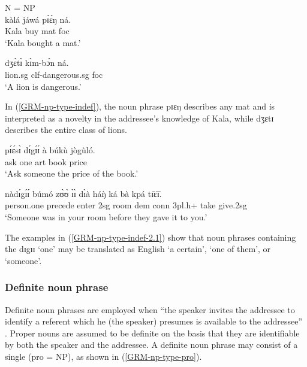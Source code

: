 \begin{exe}
\begin{exe}
\begin{exe}
\ea\label{GRM-np-type-indef}{\rm  N = NP}\\

 
\ea\label{GRM-np-indef-1}
\gll  kàlá jáwá   pɪ́ɛ́ŋ ná.\\
  Kala buy mat {\sc foc}\\
\glt  `Kala bought a mat.' 


\ex\label{GRM-np-indef-2}
\gll  dʒɛ̀tɪ̀ kɪ̀m-bɔ́n  ná.\\
  {lion.{\sc sg}} {\sc clf}-dangerous.{\sc sg} {\sc foc}\\
\glt  `A lion is dangerous.' 



\z 
 \z

In (\ref{GRM-np-type-indef}),  the noun phrase {\sls  pɪɛŋ}  describes any mat
and
is interpreted as a novelty in the addressee's knowledge of Kala, while
{\sls dʒɛtɪ} describes the entire class of lions. 


\ea\label{GRM-np-type-indef-2.1}

 \ea\label{GRM-np-type-indef-2.2}
\gll pɪ́ɛ́sɪ̀ dɪ́gɪ́ɪ́ à búkù jògùló.\\
 ask one {\sc art} book price\\
\glt  `Ask someone the price of the book.' 

 \ex\label{GRM-np-type-indef-2.3}
\gll nàdɪ́gɪ́ɪ́ búmó zʊ̀ʊ̀ ɪ̀ɪ̀ dɪ̀à háŋ̀ ká bà kpá tɪ̄ɛ̄ɪ̄.\\
 person.one precede enter {\sc 2sg} room {\sc dem} {\sc conn} {\sc 3pl.h+} take give.{\sc 2sg} \\
 \glt  `Someone was in your room before they gave it to you.' 
\z 
 \z

The examples in  
(\ref{GRM-np-type-indef-2.1})  show that noun phrases  containing the
 {\sls dɪgɪɪ} `one'  may be translated as
English `a certain', `one of them', or `someone'.


\subsubsection{Definite noun phrase}
\label{sec:GRM-np-def}

Definite noun phrases are employed when ``the speaker invites the addressee to
identify a referent which he (the speaker) presumes is available to the
addressee'' \citep[184]{Dik97}.  Proper nouns are assumed to be definite on the basis that they 
are identifiable by both the speaker and the addressee. A definite noun phrase may consist of  a 
single
 (pro = NP), as
shown in (\ref{GRM-np-type-pro}).


\end{exe}
\end{exe}
\end{exe}
